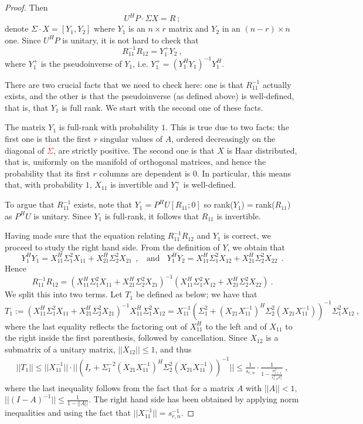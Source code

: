 \documentclass{article}
\newcommand{\red}[1]{\textcolor{red}{#1}}
\theoremstyle{definition}
\newcommand{\smin}{s_{r,n}}
\begin{document}
\begin{proof}
Then 
\[
U^H P \cdot \Sigma X = R~;
\]
denote $\Sigma \cdot X = [Y_1, Y_2]$ where $Y_1$ is an $n \times r$ matrix and $Y_2$ in an $(n-r) \times n$ one. Since $U^{H}P$ is unitary, it is not hard to check that 
\[
R_{11}^{-1} R_{12} = Y_1^{+} Y_2~,
\]
where $Y_1^{+}$ is the pseudoinverse of $Y_1$, i.e. $Y_1^{+} = (Y_1^H
Y_1)^{-1} Y_1^H$. 

There are two crucial facts that we need  to check here: one is that $R_{11}^{-1}$ actually exists, and the other is that the pseudoinverse (as defined above) is well-defined, that is, that $Y_1$ is full rank. We start with the second one of these facts.

The matrix $Y_1$ is full-rank with probability $1$. This is true due to two facts: the first one is that the first $r$ singular values of $A$, ordered decreasingly on the diagonal of \red{$\Sigma$}, are strictly positive. The second one is that $X$ is Haar distributed, that is, uniformly on the manifold of orthogonal matrices, and hence the probability that its first $r$ columns are dependent is $0$. In particular, this means that, with probability $1$, $X_{11}$ is invertible and $Y_1^{+}$ is well-defined. 

To argue that $R_{11}^{-1}$ exists, note that $Y_1 = P^HU[R_{11};0]$ so rank($Y_1$)$=$rank($R_{11}$) as $P^HU$ is unitary.  Since $Y_1$ is full-rank, it follows that $R_{11}$ is invertible.

Having made sure that the equation relating $R_{11}^{-1} R_{12}$ and $Y_1$ is correct, we proceed to study the right hand side. From the definition of $Y$, we obtain that
\[
Y_1^H Y_1 = X_{11}^H \Sigma_{1}^2 X_{11} + X_{21}^H\Sigma_2^2 X_{21}~~, ~~~~\mbox{and}~~~~ Y_1^H Y_2 = X_{11}^H \Sigma_{1}^2 X_{12} + X_{21}^H\Sigma_2^2 X_{22}~~.
\]
Hence
\[
R_{11}^{-1} R_{12} = \left (X_{11}^{H} \Sigma_1^2 X_{11} + X_{21}^{H} \Sigma_2^2 X_{21} \right)^{-1} \left ( X_{11}^{H} \Sigma_1^2 X_{12} + X_{21}^{H} \Sigma_2^2 X_{22} \right)~.
\]
We split this into two terms. Let $T_1$ be defined as below; we have that
\[
T_1 := \left (X_{11}^{H} \Sigma_1^2 X_{11} + X_{21}^H \Sigma^2_2 X_{21} \right )^{-1} X_{11}^{H} \Sigma_1^2 X_{12} = X_{11}^{-1} \left ( \Sigma_1^2 + (X_{21} X_{11}^{-1})^{H} \Sigma_2^2 (X_{21} X_{11}^{-1}) \right )^{-1} \Sigma_1^2 X_{12}~,
\]
where the last equality reflects the factoring out of $X_{11}^H$ to the left and of $X_{11}$ to the right inside the first parenthesis, followed by cancellation. 
Since $X_{12}$ is a submatrix of a unitary matrix, $||X_{12}|| \leq 1$, and thus
\begin{eqnarray} \label{r-bound}
||T_1|| \leq ||X_{11}^{-1}|| \cdot  || \left (I_r + \Sigma_1^{-2} (X_{21} X_{11}^{-1})^{H} \Sigma_2^2 (X_{21} X_{11}^{-1}) \right )^{-1}|| \leq \frac{1}{\smin} \cdot \frac{1}{1 - \frac{\sigma_{r+1}^2}{ \smin^2 \sigma_r^2}}~,
\end{eqnarray}
where the last inequality follows from the fact that for a matrix $A$ with $||A||<1$, $||(I-A)^{-1}|| \leq \frac{1}{1 - ||A||}$. The right hand side has been obtained by applying norm inequalities and using the fact that $||X_{11}^{-1}|| = \smin^{-1}$. 


\end{proof}
\end{document}
